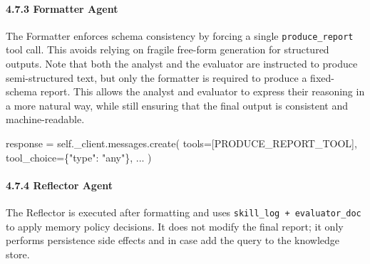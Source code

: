 \documentclass[
]{article}
\newenvironment{Shaded}{}{}
\newcommand{\NormalTok}[1]{#1}
\newcommand{\OperatorTok}[1]{\textcolor[rgb]{0.40,0.40,0.40}{#1}}
\newcommand{\StringTok}[1]{\textcolor[rgb]{0.25,0.44,0.63}{#1}}
\newcommand{\VariableTok}[1]{\textcolor[rgb]{0.10,0.09,0.49}{#1}}
\begin{document}
\paragraph{4.7.3 Formatter Agent}\label{formatter-agent}

The Formatter enforces schema consistency by forcing a single
\texttt{produce\_report} tool call. This avoids relying on fragile
free-form generation for structured outputs. Note that both the analyst
and the evaluator are instructed to produce semi-structured text, but
only the formatter is required to produce a fixed-schema report. This
allows the analyst and evaluator to express their reasoning in a more
natural way, while still ensuring that the final output is consistent
and machine-readable.

\begin{Shaded}
\begin{Highlighting}[]
\NormalTok{response }\OperatorTok{=} \VariableTok{self}\NormalTok{.\_client.messages.create(}
\NormalTok{    tools}\OperatorTok{=}\NormalTok{[PRODUCE\_REPORT\_TOOL],}
\NormalTok{    tool\_choice}\OperatorTok{=}\NormalTok{\{}\StringTok{"type"}\NormalTok{: }\StringTok{"any"}\NormalTok{\},}
\NormalTok{    ...}
\NormalTok{)}
\end{Highlighting}
\end{Shaded}

\paragraph{4.7.4 Reflector Agent}\label{reflector-agent}

The Reflector is executed after formatting and uses
\texttt{skill\_log\ +\ evaluator\_doc} to apply memory policy decisions.
It does not modify the final report; it only performs persistence side
effects and in case add the query to the knowledge store.
\end{document}
